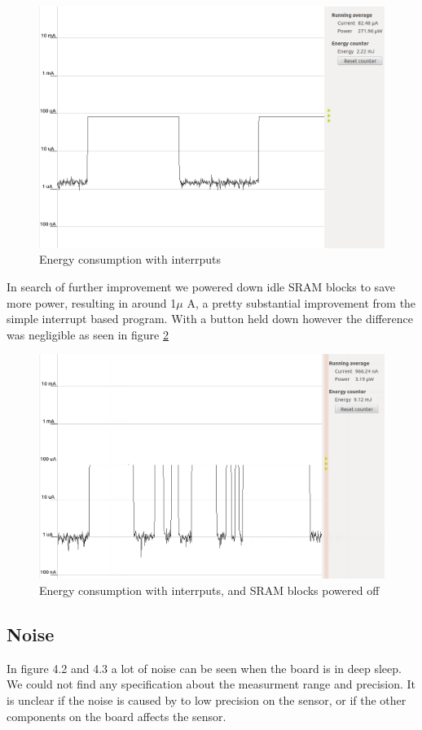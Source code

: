 \begin{figure}[ht]
 \centering
 \includegraphics[width=\textwidth]{images/performance_with_interrputs.png}
 \caption{Energy consumption with interrputs}
 \label{fig:PerformanceInterrupts}
\end{figure}

In search of further improvement we powered down idle SRAM blocks to save more power, resulting in around 1$\mu$ A, a pretty substantial improvement from the simple interrupt based program. With a button held down however the difference was negligible as seen in figure \ref{fig:PerformanceSRAM}

\begin{figure}[ht]
 \centering
 \includegraphics[width=\textwidth]{images/performance_interrupts_sram_idle.png}
 \caption{Energy consumption with interrputs, and SRAM blocks powered off}
 \label{fig:PerformanceSRAM}
\end{figure}

\subsection{Noise}
In figure 4.2 and 4.3 a lot of noise can be seen when the board is in deep sleep. We could not find any specification about the measurment range and precision. It is unclear if the noise is caused by to low precision on the sensor, or if the other components on the board affects the sensor.